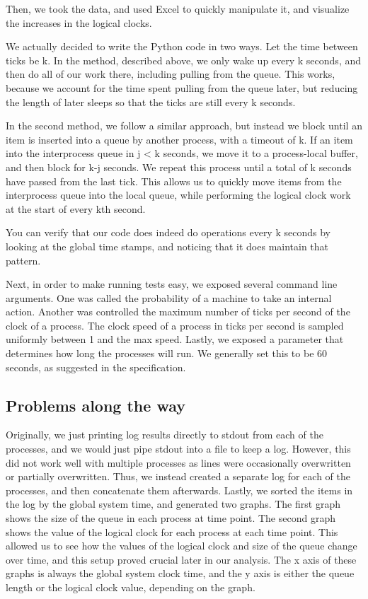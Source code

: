 \documentclass[]{article}
\begin{document}
Then, we took the data, and used Excel to quickly manipulate it, and visualize the increases in the logical clocks.

We actually decided to write the Python code in two ways. Let the time between ticks be k. In the method, described above, we only wake up every k seconds, and then do all of our work there, including pulling from the queue. This works, because we account for the time spent pulling from the queue later, but reducing the length of later sleeps so that the ticks are still every k seconds.

In the second method, we follow a similar approach, but instead we block until an item is inserted into a queue by another process, with a timeout of k. If an item into the interprocess queue in j < k seconds, we move it to a process-local buffer, and then block for k-j seconds. We repeat this process until a total of k seconds have passed from the last tick. This allows us to quickly move items from the interprocess queue into the local queue, while performing the logical clock work at the start of every kth second.

You can verify that our code does indeed do operations every k seconds by looking at the global time stamps, and noticing that it does maintain that pattern.

Next, in order to make running tests easy, we exposed several command line arguments. One was called the probability of a machine to take an internal action.  Another was controlled the maximum number of ticks per second of the clock of a process. The clock speed of a process in ticks per second is sampled uniformly between 1 and the max speed. Lastly, we exposed a parameter that determines how long the processes will run. We generally set this to be 60 seconds, as suggested in the specification.

\subsection{Problems along the way}
Originally, we just printing log results directly to stdout from each of the processes, and we would just pipe stdout into a file to keep a log. However, this did not work well with multiple processes as lines were occasionally overwritten or partially overwritten. Thus, we instead created a separate log for each of the processes, and then concatenate them afterwards. Lastly, we sorted the items in the log by the global system time, and generated two graphs. The first graph shows the size of the queue in each process at time point. The second graph shows the value of the logical clock for each process at each time point. This allowed us to see how the values of the logical clock and size of the queue change over time, and this setup proved crucial later in our analysis. The x axis of these graphs is always the global system clock time, and the y axis is either the queue length or the logical clock value, depending on the graph.
\end{document}
